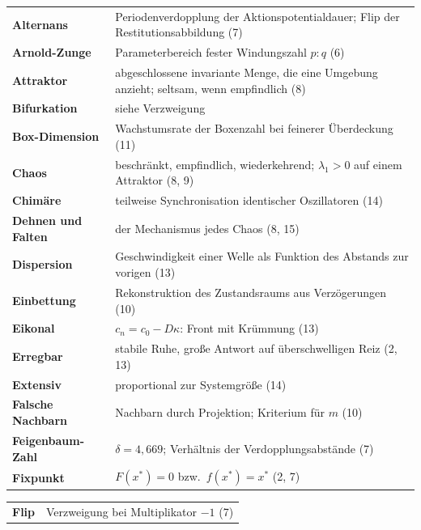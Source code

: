 \begin{merksatz}
\begin{center}
{\small
\renewcommand{\arraystretch}{1.42}
\begin{tabular}{@{}P{3.4cm}P{5.2cm}@{}}
\toprule
\textbf{Alternans} & Periodenverdopplung der Aktionspotentialdauer; Flip der Restitutionsabbildung (7)\\
\textbf{Arnold-Zunge} & Parameterbereich fester Windungszahl $p\!:\!q$ (6)\\
\textbf{Attraktor} & abgeschlossene invariante Menge, die eine Umgebung anzieht; seltsam, wenn empfindlich (8)\\
\textbf{Bifurkation} & siehe Verzweigung\\
\textbf{Box-Dimension} & Wachstumsrate der Boxenzahl bei feinerer Überdeckung (11)\\
\textbf{Chaos} & beschränkt, empfindlich, wiederkehrend; $\lambda_1 > 0$ auf einem Attraktor (8, 9)\\
\textbf{Chimäre} & teilweise Synchronisation identischer Oszillatoren (14)\\
\textbf{Dehnen und Falten} & der Mechanismus jedes Chaos (8, 15)\\
\textbf{Dispersion} & Geschwindigkeit einer Welle als Funktion des Abstands zur vorigen (13)\\
\textbf{Einbettung} & Rekonstruktion des Zustandsraums aus Verzögerungen (10)\\
\textbf{Eikonal} & $c_n = c_0 - D\kappa$: Front mit Krümmung (13)\\
\textbf{Erregbar} & stabile Ruhe, große Antwort auf überschwelligen Reiz (2, 13)\\
\textbf{Extensiv} & proportional zur Systemgröße (14)\\
\textbf{Falsche Nachbarn} & Nachbarn durch Projektion; Kriterium für $m$ (10)\\
\textbf{Feigenbaum-Zahl} & $\delta = 4{,}669$; Verhältnis der Verdopplungsabstände (7)\\
\textbf{Fixpunkt} & $F(x^*) = 0$ bzw.\ $f(x^*) = x^*$ (2, 7)\\
\bottomrule
\end{tabular}}
\end{center}
\begin{center}
{\small
\renewcommand{\arraystretch}{1.42}
\begin{tabular}{@{}P{3.4cm}P{5.2cm}@{}}
\toprule
\textbf{Flip} & Verzweigung bei Multiplikator $-1$ (7)\\

\end{tabular}}
\end{center}
\end{merksatz}
